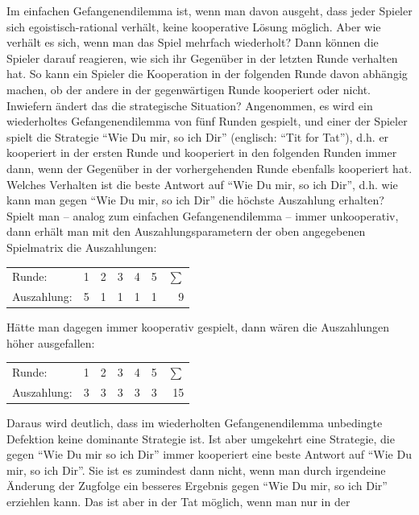 Im einfachen Gefangenendilemma ist, wenn man davon ausgeht, dass jeder Spieler
sich egoistisch-rational verhält, keine kooperative Lösung möglich. Aber wie
verhält es sich, wenn man das Spiel mehrfach wiederholt? Dann können die
Spieler darauf reagieren, wie sich ihr Gegenüber in der letzten Runde verhalten
hat. So kann ein Spieler die Kooperation in der folgenden Runde davon abhängig
machen, ob der andere in der gegenwärtigen Runde kooperiert oder nicht.
Inwiefern ändert das die strategische Situation? Angenommen, es wird ein
wiederholtes Gefangenendilemma von fünf Runden gespielt, und einer der Spieler
spielt die Strategie "`Wie Du mir, so ich Dir"' (englisch: "`Tit for Tat"'),
d.h. er kooperiert in der ersten Runde und kooperiert in den folgenden Runden
immer dann, wenn der Gegenüber in der vorhergehenden Runde ebenfalls kooperiert
hat. Welches Verhalten ist die beste Antwort auf "`Wie Du mir, so ich Dir"',
d.h. wie kann man gegen "`Wie Du mir, so ich Dir"' die höchste Auszahlung
erhalten? Spielt man -- analog zum einfachen Gefangenendilemma -- immer
unkooperativ, dann erhält man mit den Auszahlungsparametern der oben angegebenen
Spielmatrix die Auszahlungen:
\begin{center}
\begin{tabular}{|l|c|c|c|c|c|r|}
\cline{1-7}
Runde:       & 1 & 2 & 3 & 4 & 5 & $\sum$ \\
\cline{1-7}
Auszahlung:  & 5 & 1 & 1 & 1 & 1 & 9 \\
\cline{1-7}
\end{tabular}
\end{center}
Hätte man dagegen immer kooperativ gespielt, dann wären die Auszahlungen höher
ausgefallen:
\begin{center}
\begin{tabular}{|l|c|c|c|c|c|r|}
\cline{1-7}
Runde:       & 1 & 2 & 3 & 4 & 5 & $\sum$ \\
\cline{1-7}
Auszahlung:  & 3 & 3 & 3 & 3 & 3 & 15 \\
\cline{1-7}
\end{tabular}
\end{center}
Daraus wird deutlich, dass im wiederholten Gefangenendilemma unbedingte
Defektion keine dominante Strategie ist. Ist aber umgekehrt eine Strategie, die
gegen "`Wie Du mir so ich Dir"' immer kooperiert eine beste Antwort auf "`Wie
Du mir, so ich Dir"'. Sie ist es zumindest dann nicht, wenn man durch
irgendeine Änderung der Zugfolge ein besseres Ergebnis gegen "`Wie Du mir, so
ich Dir"' erziehlen kann. Das ist aber in der Tat möglich, wenn man nur in der
